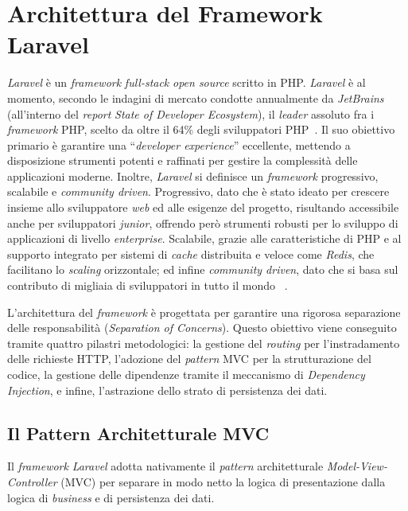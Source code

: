 \section{Architettura del Framework Laravel}
\textit{Laravel} è un \textit{framework} \textit{full-stack} \textit{open source} scritto in PHP. \textit{Laravel} è al momento, secondo le indagini di mercato condotte annualmente da \textit{JetBrains} (all'interno del \textit{report} \textit{State of Developer Ecosystem}), il \textit{leader} assoluto fra i \textit{framework} PHP, scelto da oltre il 64\% degli sviluppatori PHP~\autocite{StatePHP2025}.
Il suo obiettivo primario è garantire una ``\textit{developer experience}'' eccellente, mettendo a disposizione strumenti potenti e raffinati per gestire la complessità delle applicazioni moderne.
Inoltre, \textit{Laravel} si definisce un \textit{framework} progressivo, scalabile e \textit{community driven}. Progressivo, dato che è stato ideato per crescere insieme allo sviluppatore \textit{web} ed alle esigenze del progetto, risultando accessibile anche per sviluppatori \textit{junior}, offrendo però strumenti robusti per lo sviluppo di applicazioni di livello \textit{enterprise}. Scalabile, grazie alle caratteristiche di PHP e al supporto integrato per sistemi di \textit{cache} distribuita e veloce come \textit{Redis}, che facilitano lo \textit{scaling} orizzontale; ed infine \textit{community driven}, dato che si basa sul contributo di migliaia di sviluppatori in tutto il mondo~\autocite{InstallationLaravel13x} .

L'architettura del \textit{framework} è progettata per garantire una rigorosa separazione delle responsabilità (\textit{Separation of Concerns}). Questo obiettivo viene conseguito tramite quattro pilastri metodologici: la gestione del \textit{routing} per l’instradamento delle richieste HTTP, l’adozione del \textit{pattern} MVC per la strutturazione del codice, la gestione delle dipendenze tramite il meccanismo di \textit{Dependency Injection}, e infine, l’astrazione dello strato di persistenza dei dati.

\subsection{Il Pattern Architetturale MVC }

Il \textit{framework} \textit{Laravel} adotta nativamente il \textit{pattern} architetturale \textit{Model-View-Controller} (MVC) per separare in modo netto la logica di presentazione dalla logica di \textit{business} e di persistenza dei dati.

